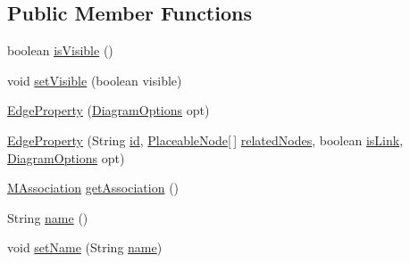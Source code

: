 \subsection*{Public Member Functions}
\begin{DoxyCompactItemize}
\item 
boolean \hyperlink{classorg_1_1tzi_1_1use_1_1gui_1_1views_1_1diagrams_1_1elements_1_1_edge_property_a70ede68bff055ff3e778df3672ff475c}{is\-Visible} ()
\item 
void \hyperlink{classorg_1_1tzi_1_1use_1_1gui_1_1views_1_1diagrams_1_1elements_1_1_edge_property_ab55ef65d829d60cabf35edb9e0d5b767}{set\-Visible} (boolean visible)
\item 
\hyperlink{classorg_1_1tzi_1_1use_1_1gui_1_1views_1_1diagrams_1_1elements_1_1_edge_property_a588dd85d933df23d77c63e61dc4bf2c6}{Edge\-Property} (\hyperlink{classorg_1_1tzi_1_1use_1_1gui_1_1views_1_1diagrams_1_1_diagram_options}{Diagram\-Options} opt)
\item 
\hyperlink{classorg_1_1tzi_1_1use_1_1gui_1_1views_1_1diagrams_1_1elements_1_1_edge_property_af6df7a78517c05ae0cba9a59cf56b497}{Edge\-Property} (String \hyperlink{classorg_1_1tzi_1_1use_1_1gui_1_1views_1_1diagrams_1_1elements_1_1_edge_property_a628f8eb4c55c3973fb61f0d76787ac0b}{id}, \hyperlink{classorg_1_1tzi_1_1use_1_1gui_1_1views_1_1diagrams_1_1elements_1_1_placeable_node}{Placeable\-Node}\mbox{[}$\,$\mbox{]} \hyperlink{classorg_1_1tzi_1_1use_1_1gui_1_1views_1_1diagrams_1_1elements_1_1_edge_property_a9d2b1f0f113e942b43fbc4e1407d51fb}{related\-Nodes}, boolean \hyperlink{classorg_1_1tzi_1_1use_1_1gui_1_1views_1_1diagrams_1_1elements_1_1_edge_property_a6e91f4d4f439e3c373d762f81f3d4ad4}{is\-Link}, \hyperlink{classorg_1_1tzi_1_1use_1_1gui_1_1views_1_1diagrams_1_1_diagram_options}{Diagram\-Options} opt)
\item 
\hyperlink{interfaceorg_1_1tzi_1_1use_1_1uml_1_1mm_1_1_m_association}{M\-Association} \hyperlink{classorg_1_1tzi_1_1use_1_1gui_1_1views_1_1diagrams_1_1elements_1_1_edge_property_a6f148d76816f9c7811b6944ce94690ff}{get\-Association} ()
\item 
String \hyperlink{classorg_1_1tzi_1_1use_1_1gui_1_1views_1_1diagrams_1_1elements_1_1_edge_property_a17fb3bbc82d7d5a13fdd6ee5f996562f}{name} ()
\item 
void \hyperlink{classorg_1_1tzi_1_1use_1_1gui_1_1views_1_1diagrams_1_1elements_1_1_edge_property_af62bb8224bfea5e707c1e847156e2b44}{set\-Name} (String \hyperlink{classorg_1_1tzi_1_1use_1_1gui_1_1views_1_1diagrams_1_1elements_1_1_edge_property_a17fb3bbc82d7d5a13fdd6ee5f996562f}{name})

\end{DoxyCompactItemize}
